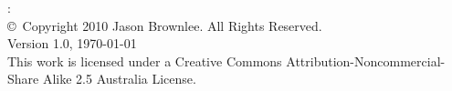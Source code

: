 


\begin{flushleft}
%
\mybooktitle: \mybooksubtitle \\
\copyright\ Copyright 2010 Jason Brownlee. All Rights Reserved. \\
\small{
Version 1.0, \today \\
This work is licensed under a Creative Commons Attribution-Noncommercial-Share Alike 2.5 Australia License.
}
%
\end{flushleft}

\hfill


	
\vfill\vfill\vfill